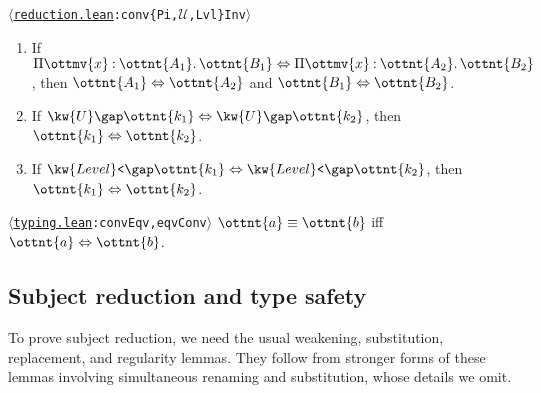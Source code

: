 \documentclass[a4paper,UKenglish,cleveref,autoref,thm-restate]{lipics-v2021}
\newcommand{\repo}{https://github.com/ionathanch/TTBFL}
\newcommand{\thmref}[2]{%
  $\langle$\href{\repo/tree/main/src/#1}{\texttt{#1}}\texttt{:#2}$\rangle$%
}
\begin{document}
\begin{lemma} \thmref{reduction.lean}{conv\{Pi,$\mathcal{U}$,Lvl\}Inv}
  \begin{enumerate}[topsep=0pt]
    \item If $  \Pi  \ottmv{x}  \mathbin{:}  \ottnt{A_{{\mathrm{1}}}}  \mathpunct{.}  \ottnt{B_{{\mathrm{1}}}}   \Leftrightarrow   \Pi  \ottmv{x}  \mathbin{:}  \ottnt{A_{{\mathrm{2}}}}  \mathpunct{.}  \ottnt{B_{{\mathrm{2}}}}  $, then $ \ottnt{A_{{\mathrm{1}}}}  \Leftrightarrow  \ottnt{A_{{\mathrm{2}}}} $ and $ \ottnt{B_{{\mathrm{1}}}}  \Leftrightarrow  \ottnt{B_{{\mathrm{2}}}} $.
    \item If $  \kw{U} \gap  \ottnt{k_{{\mathrm{1}}}}   \Leftrightarrow   \kw{U} \gap  \ottnt{k_{{\mathrm{2}}}}  $, then $ \ottnt{k_{{\mathrm{1}}}}  \Leftrightarrow  \ottnt{k_{{\mathrm{2}}}} $.
    \item If $  \kw{Level}\texttt{<} \gap  \ottnt{k_{{\mathrm{1}}}}   \Leftrightarrow   \kw{Level}\texttt{<} \gap  \ottnt{k_{{\mathrm{2}}}}  $, then $ \ottnt{k_{{\mathrm{1}}}}  \Leftrightarrow  \ottnt{k_{{\mathrm{2}}}} $.
  \end{enumerate}
\end{lemma}

\begin{theorem} \thmref{typing.lean}{convEqv,eqvConv} \label{lem:eq-conv}
  $ \ottnt{a}  \equiv  \ottnt{b} $ iff $ \ottnt{a}  \Leftrightarrow  \ottnt{b} $.
\end{theorem}

\subsection{Subject reduction and type safety}

To prove subject reduction,
we need the usual weakening, substitution, replacement, and regularity lemmas.
They follow from stronger forms of these lemmas involving simultaneous renaming and substitution,
whose details we omit.
\end{document}
